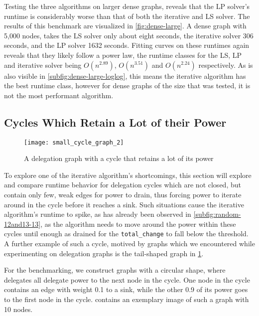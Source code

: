Testing the three algorithms on larger dense graphs, reveals that the LP solver's runtime is considerably worse than that of both the iterative and LS solver. The results of this benchmark are visualized in \cref{fig:dense-large}. A dense graph with 5,000 nodes, takes the LS solver only about eight seconds, the iterative solver 306 seconds, and the LP solver 1632 seconds. Fitting curves on these runtimes again reveals that they likely follow a power law, the runtime classes for the LS, LP and iterative solver being $O(n^{2.89})$, $O(n^{3.51})$ and $O(n^{2.24})$ respectively. As is also visible in \cref{subfig:dense-large-loglog}, this means the iterative algorithm has the best runtime class, however for dense graphs of the size that was tested, it is not the most performant algorithm.

\subsection{Cycles Which Retain a Lot of their Power}
\label{subsec:cycles_draining}

\begin{figure}
\centering
\texttt{[image: small\_cycle\_graph\_2]}
\caption{A delegation graph with a cycle that retains a lot of its power}
\label{fig:cycle_example}
\end{figure}

To explore one of the iterative algorithm's shortcomings, this section will explore and compare runtime behavior for delegation cycles which are not closed, but contain only few, weak edges for power to drain, thus forcing power to iterate around in the cycle before it reaches a sink. Such situations cause the iterative algorithm's runtime to spike, as has already been observed in \cref{subfig:random-12and13-13}, as the algorithm needs to move around the power within these cycles until enough as drained for the \texttt{total\_change} to fall below the threshold. A further example of such a cycle, motived by graphs which we encountered while experimenting on delegation graphs is the tail-shaped graph in \cref{fig:cycle_example}. 

For the benchmarking, we construct graphs with a circular shape, where delegates all delegate power to the next node in the cycle. One node in the cycle contains an edge with weight 0.1 to a sink, while the other 0.9 of its power goes to the first node in the cycle.  contains an exemplary image of such a graph with 10 nodes. 

